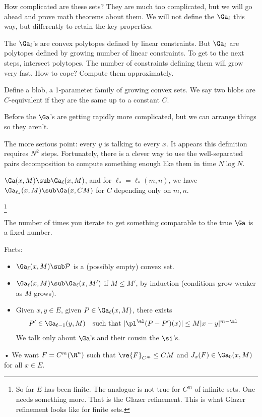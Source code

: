 How complicated are these sets? They are much too complicated, but we will go ahead and prove math theorems about them. We will not define the $\Ga_\ell$ this way, but differently to retain the key properties.

The $\Ga_\ell$'s are convex polytopes defined by linear constraints. But $\Ga_\ell$ are polytopes defined by growing number of linear constraints. To get to the next steps, intersect polytopes. The number of constraints defining them will grow very fast.
How to cope?
Compute them approximately. 

Define a blob, a 1-parameter family of growing convex sets.
We say two blobs are $C$-equivalent if they are the same up to a constant $C$. 

Before the $\Ga$'s are getting rapidly more complicated, but we can arrange things so they aren't.

The more serious point: every $y$ is talking to every $x$. It appears this definition requires $N^2$ steps. Fortunately, there is a clever way to use the well-separated pairs decomposition to compute something enough like them in time $N\log N$. 

\begin{thm}
$\Ga(x,M)\sub \Ga_\ell(x,M)$, and for $\ell_*=\ell_*(m,n)$, we have $\Ga_{\ell_*}(x,M) \sub \Ga(x,CM)$ for $C$ depending only on $m,n$.
\end{thm}
\footnote{So far $E$ has been finite. The analogue is not true for $C^m$ of infinite sets. One needs something more. That is the Glazer refinement. This is what Glazer refinement looks like for finite sets.}

The number of times you iterate to get something comparable to the true $\Ga$ is a fixed number.

Facts:
\begin{itemize}
\item
$\Ga_\ell(x,M)\sub \cal P$ is a (possibly empty) convex set.
\item %
$\Ga_\ell(x,M)\sub \Ga_\ell(x,M')$ if $M\le M'$, by induction (conditions grow weaker as $M$ grows).
\item
Given $x,y\in E$, given $P\in \Ga_\ell(x,M)$, there exists
\begin{align}
P'&\in \Ga_{\ell-1}(y,M)&
\text{such that }|\pl^\al (P-P') (x)|&\le M|x-y|^{m-\al}
\end{align}
We talk only about $\Ga$'s and their cousin the $\si$'s. %
\end{itemize}•
We want $F=C^m(\R^n)$ such that $\ve{F}_{C^m}\le CM$ and $J_x(F) \in \Ga_0(x,M)$ for all $x\in E$. 

